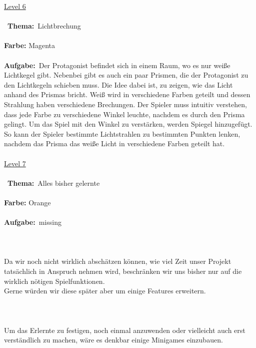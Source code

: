 \documentclass[10pt,a4paper,notitlepage]{report}
\begin{document}
	\underline{Level 6}\\\\\
	\textbf{Thema:}\
	Lichtbrechung
	\\\\
	\textbf{Farbe:} Magenta\
	\\\\
	\textbf{Aufgabe:}\
	Der Protagonist befindet sich in einem Raum, wo es nur weiße Lichtkegel gibt. Nebenbei gibt es auch ein paar Prismen, die der Protagonist zu den Lichtkegeln 		schieben muss. Die Idee dabei ist, zu zeigen, wie das Licht anhand des Prismas bricht. Weiß wird in verschiedene Farben geteilt und dessen Strahlung haben 		verschiedene Brechungen. Der Spieler muss intuitiv verstehen, dass jede Farbe zu verschiedene Winkel leuchte, nachdem es durch den Prisma gelingt. Um das 		Spiel mit den Winkel zu verstärken, werden Spiegel hinzugefügt. So kann der Spieler bestimmte Lichtstrahlen zu bestimmten Punkten lenken, nachdem das 		Prisma das weiße Licht in verschiedene Farben geteilt hat.
	\\\\
	\underline{Level 7}\\\\\
	\textbf{Thema:}\
	Alles bisher gelernte
	\\\\
	\textbf{Farbe:} Orange\
	\\\\
	\textbf{Aufgabe:}\
	missing
	\\
	\clearpage\
	\marginpar{\vspace{3.0mm} \color{orange}\rule{0.8mm}{53.3mm} \\[3mm] \color{hellorange}\rule{0.8mm}{170mm}}
	\\
	\
	\\\\
	\Text
		Da wir noch nicht wirklich abschätzen können, wie viel Zeit unser Projekt tatsächlich in Anspruch nehmen wird, 
	beschränken wir uns bisher nur auf die wirklich nötigen Spielfunktionen. \\
	Gerne würden wir diese später aber um einige Features erweitern.
	\\\\
	\
	\\\\
	\Text
		Um das Erlernte zu festigen, noch einmal anzuwenden oder vielleicht auch erst verständlich zu machen, wäre es denkbar einige Minigames einzubauen.\\ 
\end{document}
